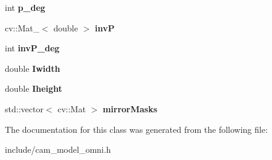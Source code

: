 \begin{DoxyCompactItemize}
\item 
int {\bfseries p\+\_\+deg}\hypertarget{classMultiColSLAM_1_1cCamModelGeneral___a0dcac4bbaef35e9e473589be0fbd4f45}{}\label{classMultiColSLAM_1_1cCamModelGeneral___a0dcac4bbaef35e9e473589be0fbd4f45}

\item 
cv\+::\+Mat\+\_\+$<$ double $>$ {\bfseries invP}\hypertarget{classMultiColSLAM_1_1cCamModelGeneral___a31a0f7be79070b7c73ef2c36e51b5685}{}\label{classMultiColSLAM_1_1cCamModelGeneral___a31a0f7be79070b7c73ef2c36e51b5685}

\item 
int {\bfseries inv\+P\+\_\+deg}\hypertarget{classMultiColSLAM_1_1cCamModelGeneral___ab5124028fda818ec1cbe8bd14168b63f}{}\label{classMultiColSLAM_1_1cCamModelGeneral___ab5124028fda818ec1cbe8bd14168b63f}

\item 
double {\bfseries Iwidth}\hypertarget{classMultiColSLAM_1_1cCamModelGeneral___a82c73c92bfa6a0486aa90b77d97650ac}{}\label{classMultiColSLAM_1_1cCamModelGeneral___a82c73c92bfa6a0486aa90b77d97650ac}

\item 
double {\bfseries Iheight}\hypertarget{classMultiColSLAM_1_1cCamModelGeneral___a7eec8057dd72af77ccf9aa98090b81eb}{}\label{classMultiColSLAM_1_1cCamModelGeneral___a7eec8057dd72af77ccf9aa98090b81eb}

\item 
std\+::vector$<$ cv\+::\+Mat $>$ {\bfseries mirror\+Masks}\hypertarget{classMultiColSLAM_1_1cCamModelGeneral___a34efd33c0c7b74dfd7a93c797c812c1a}{}\label{classMultiColSLAM_1_1cCamModelGeneral___a34efd33c0c7b74dfd7a93c797c812c1a}

\end{DoxyCompactItemize}


The documentation for this class was generated from the following file\+:\begin{DoxyCompactItemize}
\item 
include/cam\+\_\+model\+\_\+omni.\+h\end{DoxyCompactItemize}
